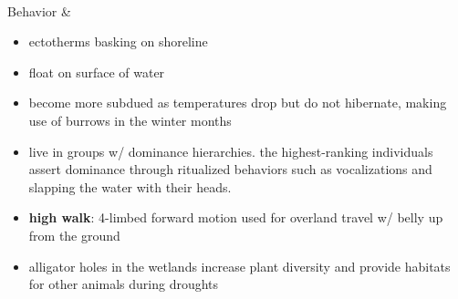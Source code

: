 \begin{center}
\begin{longtabu}
	\\
	\hline
	Behavior & 
	\begin{itemize}[noitemsep]
		\item ectotherms basking on shoreline
		\item float on surface of water
		\item become more subdued as temperatures drop but do not hibernate, making use of burrows in the winter months
		\item live in groups w/ dominance hierarchies. the highest-ranking individuals assert dominance through ritualized behaviors such as vocalizations and slapping the water with their heads.
		\item \textbf{high walk}: 4-limbed forward motion used for overland travel w/ belly up from the ground
		\item alligator holes in the wetlands increase plant diversity and provide habitats for other animals during droughts
		

\end{itemize}
\end{longtabu}
\end{center}
